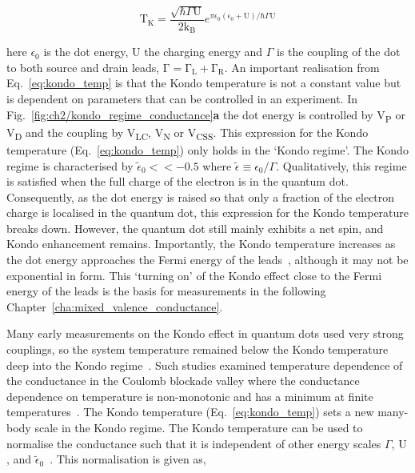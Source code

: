 \begin{equation}\label{eq:kondo_temp}
 \mathrm{T_K} = 
 \frac{\sqrt{\hbar\Gamma \mathrm{U}}}{2\mathrm{k_B}}
 e^{\pi \epsilon_0 (\epsilon_0 + \mathrm{U})/\hbar\Gamma\mathrm{U}}
\end{equation}

 \noindent here $\epsilon_0$ is the dot energy, $\mathrm{U}$ the charging energy and $\Gamma$ is the coupling of the dot to both source and drain leads, $\mathrm{\Gamma = \Gamma_L + \Gamma_R}$. 
 An important realisation from Eq.~\ref{eq:kondo_temp} is that the Kondo temperature is not a constant value but is dependent on parameters that can be controlled in an experiment. 
 In Fig.~\ref{fig:ch2/kondo_regime_conductance}\textbf{a} the dot energy is controlled by V\textsubscript{P} or V\textsubscript{D} and the coupling by V\textsubscript{LC}, V\textsubscript{N} or V\textsubscript{CSS}.
This expression for the Kondo temperature (Eq.~\ref{eq:kondo_temp}) only holds in the `Kondo regime'. The Kondo regime is characterised by $\tilde{\epsilon}_0<<-0.5$ where $\tilde{\epsilon}\equiv \epsilon_0/\Gamma$. Qualitatively, this regime is satisfied when the full charge of the electron is in the quantum dot. Consequently, as the dot energy is raised so that only a fraction of the electron charge is localised in the quantum dot, this expression for the Kondo temperature breaks down. However, the quantum dot still mainly exhibits a net spin, and Kondo enhancement remains. Importantly, the Kondo temperature increases as the dot energy approaches the Fermi energy of the leads~\cite{goldhaber_mv}, although it may not be exponential in form. This `turning on' of the Kondo effect close to the Fermi energy of the leads is the basis for measurements in the following Chapter~\ref{cha:mixed_valence_conductance}.
 

Many early measurements on the Kondo effect in quantum dots used very strong couplings, so the system temperature remained below the Kondo temperature deep into the Kondo regime~\cite{kondo_unitary}. Such studies examined temperature dependence of the conductance in the Coulomb blockade valley where the conductance dependence on temperature is non-monotonic and has a minimum at finite temperatures~\cite{Pustilnik2004}. The Kondo temperature (Eq.~\ref{eq:kondo_temp}) sets a new many-body scale in the Kondo regime. The Kondo temperature can be used to normalise the conductance such that it is independent of other energy scales $\Gamma$, $\mathrm{U}$, and $\tilde{\epsilon}_0$~\cite{costi_kondo_mv_eo_regime}. This normalisation is given as, 

